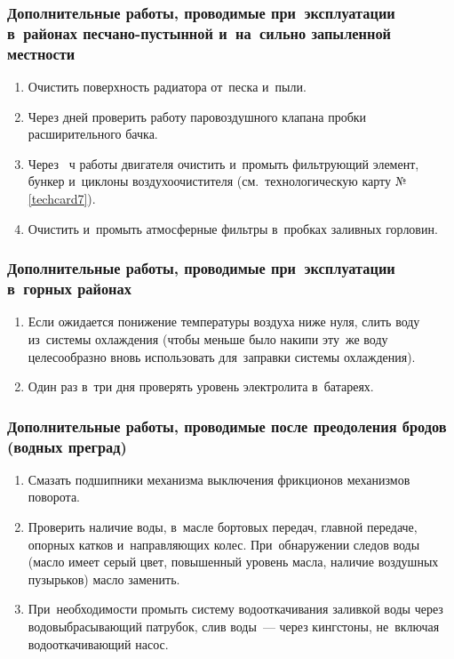 \subsubsection{Дополнительные работы, проводимые при~эксплуатации в~районах песчано-пустынной и~на~сильно запыленной местности}
\begin{enumerate}
    \item Очистить поверхность радиатора от~песка и~пыли. 
    \item Через  дней проверить работу паровоздушного клапана пробки расширительного бачка. 
    \item Через ~ч работы двигателя очистить и~промыть фильтрующий элемент, бункер и~циклоны воздухоочистителя (см.~технологическую карту №\ref{techcard7}).
    \item Очистить и~промыть атмосферные фильтры в~пробках заливных горловин. 
\end{enumerate}

\subsubsection{Дополнительные работы, проводимые при~эксплуатации в~горных районах}
\begin{enumerate}
    \item Если ожидается понижение температуры воздуха ниже нуля, слить воду из~системы охлаждения (чтобы меньше было накипи эту~же воду целесообразно вновь использовать для~заправки системы охлаждения). 
    \item Один раз в~три дня проверять уровень электролита в~батареях.
\end{enumerate}

\subsubsection{Дополнительные работы, проводимые после преодоления бродов (водных преград)}
\begin{enumerate}
    \item Смазать подшипники механизма выключения фрикционов механизмов поворота. 
    \item Проверить наличие воды, в~масле бортовых передач, главной передаче, опорных катков и~направляющих колес. При~обнаружении следов воды (масло имеет серый цвет, повышенный уровень масла, наличие воздушных пузырьков) масло заменить. 
    \item При~необходимости промыть систему водооткачивания заливкой воды через водовыбрасывающий патрубок, слив воды~--- через кингстоны, не~включая водооткачивающий насос. 
\end{enumerate}

